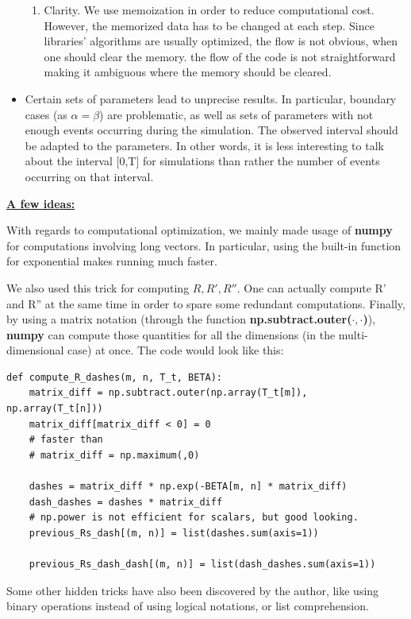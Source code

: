 \begin{itemize}
\begin{enumerate}
\item Clarity. We use memoization in order to reduce computational cost. However, the memorized data has to be changed at each step. Since libraries' algorithms are usually optimized, the flow is not obvious,  when one should clear the memory.
the flow of the code is not straightforward making it ambiguous where the memory should be cleared.
\end{enumerate}
\item Certain sets of parameters lead to unprecise results. In particular, boundary cases (as $\alpha = \beta$) are problematic, as well as sets of parameters with not enough events occurring during the simulation. The observed interval should be adapted to the parameters. In other words, it is less interesting to talk about the interval [0,T] for simulations than rather the number of events occurring on that interval.
\end{itemize}

\underline{\textbf{A few ideas:}}

With regards to computational optimization, we mainly made usage of \textbf{numpy} for computations involving long vectors. In particular, using the built-in function for exponential makes running much faster. 

We also used this trick for computing $R,R',R''$. One can actually compute R' and R'' at the same time in order to spare some redundant computations. Finally, by using a matrix notation (through the function \textbf{np.subtract.outer($\cdot,\cdot$)}), \textbf{numpy} can compute those quantities for all the dimensions (in the multi-dimensional case) at once. The code would look like this:

\begin{verbatim}
def compute_R_dashes(m, n, T_t, BETA):
    matrix_diff = np.subtract.outer(np.array(T_t[m]), np.array(T_t[n]))
    matrix_diff[matrix_diff < 0] = 0
    # faster than
    # matrix_diff = np.maximum(,0)

    dashes = matrix_diff * np.exp(-BETA[m, n] * matrix_diff)
    dash_dashes = dashes * matrix_diff
    # np.power is not efficient for scalars, but good looking.
    previous_Rs_dash[(m, n)] = list(dashes.sum(axis=1))

    previous_Rs_dash_dash[(m, n)] = list(dash_dashes.sum(axis=1))
\end{verbatim}

Some other hidden tricks have also been discovered by the author, like using binary operations instead of using logical notations, or list comprehension.

